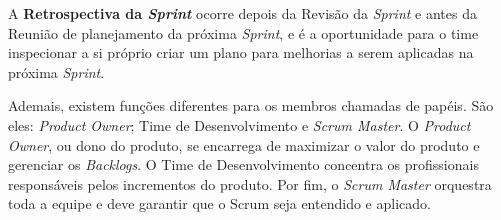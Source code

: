 A \textbf{Retrospectiva da \textit{Sprint}} ocorre depois da Revisão da \textit{Sprint} e antes da Reunião de planejamento da próxima \textit{Sprint}, e é a oportunidade para o time inspecionar a si próprio criar um plano para melhorias a serem aplicadas na próxima \textit{Sprint}.

Ademais, existem funções diferentes para os membros chamadas de papéis. São eles: \textit{Product Owner}; Time de Desenvolvimento e \textit{Scrum Master}. 
O \textit{Product Owner}, ou dono do produto, se encarrega de maximizar o valor do produto e gerenciar os \textit{Backlogs}. O Time de Desenvolvimento concentra os profissionais responsáveis pelos incrementos do produto. Por fim, o \textit{Scrum Master} orquestra toda a equipe e deve garantir que o Scrum seja entendido e aplicado.

